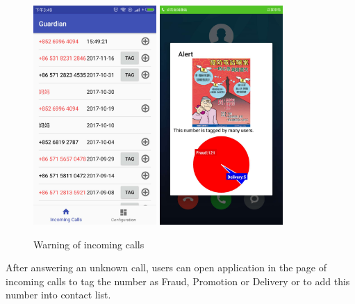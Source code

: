 \documentclass{article}
\begin{document}
    \begin{figure}[H]
        \centering
        \includegraphics[width=0.418\textwidth]{images/calls.jpg}
        \includegraphics[width=0.418\textwidth]{images/warning.jpg}
        \caption{Warning of incoming calls}
        \label{image_warning}
    \end{figure}

    After answering an unknown call, users can open application in the page of incoming calls to tag the number as Fraud, Promotion or Delivery or to add this number into contact list.
\end{document}
